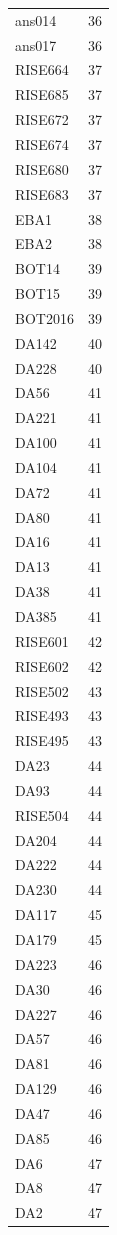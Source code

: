 \begin{longtable}[t]{ll}
ans014 & 36\\
ans017 & 36\\
RISE664 & 37\\
RISE685 & 37\\
RISE672 & 37\\
RISE674 & 37\\
RISE680 & 37\\
RISE683 & 37\\
EBA1 & 38\\
EBA2 & 38\\
BOT14 & 39\\
BOT15 & 39\\
BOT2016 & 39\\
DA142 & 40\\
DA228 & 40\\
DA56 & 41\\
DA221 & 41\\
DA100 & 41\\
DA104 & 41\\
DA72 & 41\\
DA80 & 41\\
DA16 & 41\\
DA13 & 41\\
DA38 & 41\\
DA385 & 41\\
RISE601 & 42\\
RISE602 & 42\\
RISE502 & 43\\
RISE493 & 43\\
RISE495 & 43\\
DA23 & 44\\
DA93 & 44\\
RISE504 & 44\\
DA204 & 44\\
DA222 & 44\\
DA230 & 44\\
DA117 & 45\\
DA179 & 45\\
DA223 & 46\\
DA30 & 46\\
DA227 & 46\\
DA57 & 46\\
DA81 & 46\\
DA129 & 46\\
DA47 & 46\\
DA85 & 46\\
DA6 & 47\\
DA8 & 47\\
DA2 & 47\\

\end{longtable}
